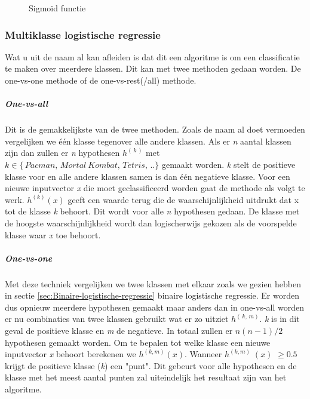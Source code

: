 \begin{figure}
	\centering
	\caption{Sigmoïd functie}
	\label{fig:sigmoid-functie}
\end{figure}
 

\subsubsection{Multiklasse logistische regressie}
\label{sec:Multiklasse-logistische-regressie}
Wat u uit de naam al kan afleiden is dat dit een algoritme is om een classificatie te maken over meerdere klassen. Dit kan met twee methoden gedaan worden. De one-vs-one methode of de one-vs-rest(/all) methode. 
\subparagraph{One-vs-all}
Dit is de gemakkelijkste van de twee methoden. Zoals de naam al doet vermoeden vergelijken we één klasse tegenover alle andere klassen. Als er \textit{n} aantal klassen zijn dan zullen er \textit{n} hypothesen $h^{(\,k\,)}$ met $k \in \{\,Pacman, \, Mortal \:Kombat, \, Tetris, \,..\}$ gemaakt worden. \textit{k} stelt de positieve klasse voor en alle andere klassen samen is dan één negatieve klasse. \newline
Voor een nieuwe inputvector \textit{x} die moet geclassificeerd worden gaat de methode als volgt te werk. $h^{(k)} (x)$ geeft een waarde terug die de waarschijnlijkheid uitdrukt dat x tot de klasse \textit{k} behoort. Dit wordt voor alle \textit{n} hypothesen gedaan. De klasse met de hoogste waarschijnlijkheid wordt dan logischerwijs gekozen als de voorspelde klasse waar \textit{x} toe behoort. 
\subparagraph{One-vs-one}
Met deze techniek vergelijken we twee klassen met elkaar zoals we gezien hebben in sectie \ref{sec:Binaire-logistische-regressie} binaire logistische regressie. Er worden dus opnieuw meerdere hypothesen gemaakt maar anders dan in one-vs-all worden er nu combinaties van twee klassen gebruikt wat er zo uitziet $h^{(\,k,\,m)}$. \textit{k} is in dit geval de positieve klasse en \textit{m} de negatieve. In totaal zullen er $n(n-1)/2$ hypothesen gemaakt worden.
Om te bepalen tot welke klasse een nieuwe inputvector \textit{x} behoort berekenen we $h^{(k,m)}(x)$. Wanneer $h^{(k,m)}\;(x)$ $\geq 0.5$ krijgt de positieve klasse (\textit{k}) een "punt". Dit gebeurt voor alle hypothesen en de klasse met het meest aantal punten zal uiteindelijk het resultaat zijn van het algoritme. 

